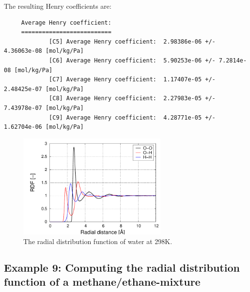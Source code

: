 The resulting Henry coefficients are:
\begin{tiny}
\begin{verbatim}
     Average Henry coefficient:
     ==========================
             [C5] Average Henry coefficient:  2.98386e-06 +/- 4.36063e-08 [mol/kg/Pa]
             [C6] Average Henry coefficient:  5.90253e-06 +/- 7.2814e-08 [mol/kg/Pa]
             [C7] Average Henry coefficient:  1.17407e-05 +/- 2.48425e-07 [mol/kg/Pa]
             [C8] Average Henry coefficient:  2.27983e-05 +/- 7.43978e-07 [mol/kg/Pa]
             [C9] Average Henry coefficient:  4.28771e-05 +/- 1.62704e-06 [mol/kg/Pa]
\end{verbatim}
\end{tiny}

\begin{figure}[t]
  \centering
  \includegraphics[width=7.5cm]{./Examples/RDFWater.pdf}
  \caption{The radial distribution function of water at 298K.}
  \label{Fig: RDF water}
\end{figure}

\subsection*{Example 9: Computing the radial distribution function of a methane/ethane-mixture}

